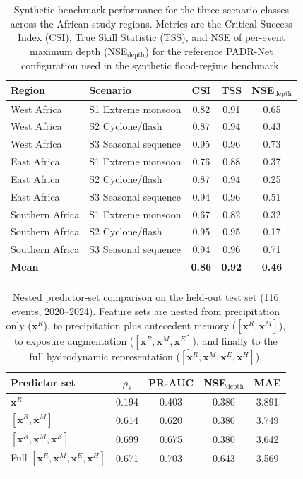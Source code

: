 \documentclass[pdflatex,sn-mathphys-ay]{sn-jnl}
\theoremstyle{thmstyleone}
\begin{document}
\begin{table}[p]
\centering
\small
\caption{%
  Synthetic benchmark performance for the three scenario classes across
  the African study regions.  Metrics are the Critical Success Index
  (CSI), True Skill Statistic (TSS), and NSE of per-event maximum depth
  (NSE$_\mathrm{depth}$) for the reference PADR-Net configuration used
  in the synthetic flood-regime benchmark.}
\label{tab:scenario_summary}
\begin{tabular}{llccc}
\toprule
Region & Scenario & CSI & TSS & NSE$_\mathrm{depth}$ \\
\midrule
West Africa & S1 Extreme monsoon & 0.82 & 0.91 & 0.65 \\
West Africa & S2 Cyclone/flash & 0.87 & 0.94 & 0.43 \\
West Africa & S3 Seasonal sequence & 0.95 & 0.96 & 0.73 \\
East Africa & S1 Extreme monsoon & 0.76 & 0.88 & 0.37 \\
East Africa & S2 Cyclone/flash & 0.87 & 0.94 & 0.25 \\
East Africa & S3 Seasonal sequence & 0.94 & 0.96 & 0.51 \\
Southern Africa & S1 Extreme monsoon & 0.67 & 0.82 & 0.32 \\
Southern Africa & S2 Cyclone/flash & 0.95 & 0.95 & 0.17 \\
Southern Africa & S3 Seasonal sequence & 0.94 & 0.96 & 0.71 \\
\midrule
\textbf{Mean} & & \textbf{0.86} & \textbf{0.92} & \textbf{0.46} \\
\botrule
\end{tabular}
\end{table}

\begin{table}[p]
\centering
\small
\caption{%
  Nested predictor-set comparison on the held-out test set
  (116 events, 2020--2024).  Feature sets are nested from
  precipitation only ($\mathbf{x}^{R}$), to precipitation plus
  antecedent memory ($[\mathbf{x}^{R},\mathbf{x}^{M}]$), to exposure
  augmentation ($[\mathbf{x}^{R},\mathbf{x}^{M},\mathbf{x}^{E}]$), and
  finally to the full hydrodynamic representation
  ($[\mathbf{x}^{R},\mathbf{x}^{M},\mathbf{x}^{E},\mathbf{x}^{H}]$).}
\label{tab:nested_results}
\begin{tabular}{lcccc}
\toprule
Predictor set & $\rho_s$ & PR-AUC & NSE$_\mathrm{depth}$ & MAE \\
\midrule
$\mathbf{x}^{R}$ & 0.194 & 0.403 & 0.380 & 3.891 \\
$[\mathbf{x}^{R},\mathbf{x}^{M}]$ & 0.614 & 0.620 & 0.380 & 3.749 \\
$[\mathbf{x}^{R},\mathbf{x}^{M},\mathbf{x}^{E}]$ & 0.699 & 0.675 & 0.380 & 3.642 \\
Full $[\mathbf{x}^{R},\mathbf{x}^{M},\mathbf{x}^{E},\mathbf{x}^{H}]$ & 0.671 & 0.703 & 0.643 & 3.569 \\
\botrule
\end{tabular}
\end{table}
\end{document}
